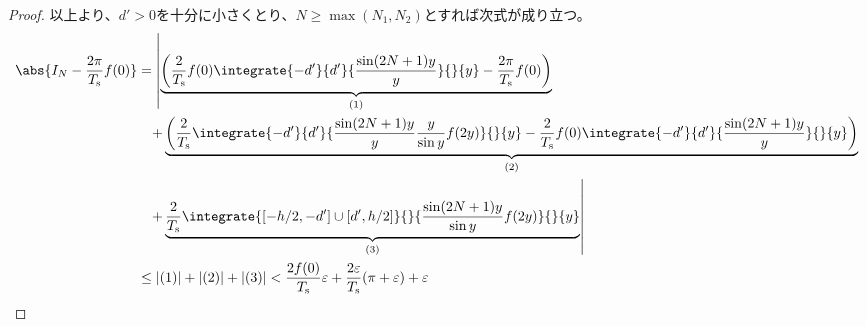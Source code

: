 \begin{proof}
            以上より、$d'>0$を十分に小さくとり、$N\geq\max(N_1,N_2)$とすれば次式が成り立つ。
            \begin{align*}
                \abs{I_N - \frac{2\pi}{\Ts} f(0)} &= \left|\underbrace{\left(\frac{2}{\Ts}f(0)\integrate{-d'}{d'}{\frac{\sin(2N+1)y}{y}}{}{y} - \frac{2\pi}{\Ts} f(0)\right)}_{(1)} \right. \\
                &\phantom{=} \left.+ \underbrace{\left(\frac{2}{\Ts}\integrate{-d'}{d'}{\frac{\sin(2N+1)y}{y}\frac{y}{\sin y}f(2y)}{}{y} - \frac{2}{\Ts}f(0)\integrate{-d'}{d'}{\frac{\sin(2N+1)y}{y}}{}{y}\right)}_{(2)} \right. \\
                &\phantom{=} \left.+ \underbrace{\frac{2}{\Ts}\integrate{[-h/2,-d']\cup[d',h/2]}{}{\frac{\sin(2N+1)y}{\sin y}f(2y)}{}{y}}_{(3)}\right| \\
                &\leq |(1)| + |(2)| + |(3)| < \frac{2f(0)}{\Ts}\varepsilon + \frac{2\varepsilon}{\Ts}(\pi+\varepsilon) + \varepsilon
            \end{align*}
        \end{proof}

